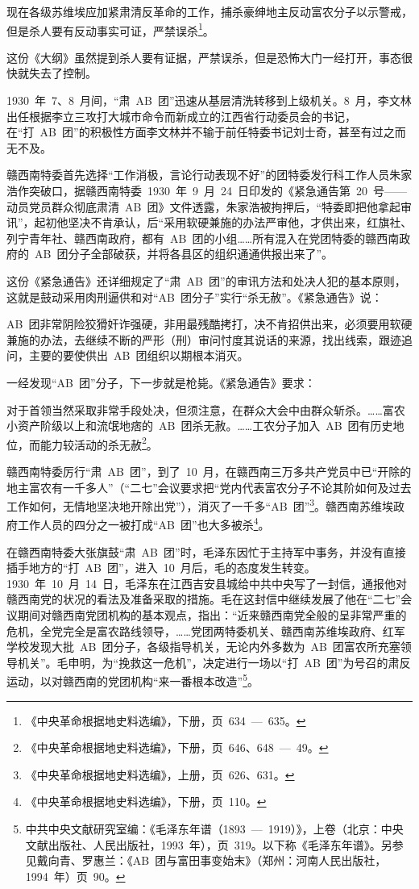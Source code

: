 \begin{quoting}
现在各级苏维埃应加紧肃清反革命的工作，捕杀豪绅地主反动富农分子以示警戒，但是杀人要有反动事实可证，严禁误杀\footnote{《中央革命根据地史料选编》，下册，页~634~—~635。}。
\end{quoting}

这份《大纲》虽然提到杀人要有证据，严禁误杀，但是恐怖大门一经打开，事态很快就失去了控制。

1930~年~7、8~月间，“肃~AB~团”迅速从基层清洗转移到上级机关。8~月，李文林出任根据李立三攻打大城市命令而新成立的江西省行动委员会的书记，在“打~AB~团”的积极性方面李文林并不输于前任特委书记刘士奇，甚至有过之而无不及。

赣西南特委首先选择“工作消极，言论行动表现不好”的团特委发行科工作人员朱家浩作突破口，据赣西南特委~1930~年~9~月~24~日印发的《紧急通告第~20~号——动员党员群众彻底肃清~AB~团》文件透露，朱家浩被拘押后，“特委即把他拿起审讯”，起初他坚决不肯承认，后“采用软硬兼施的办法严审他，才供出来，红旗社、列宁青年社、赣西南政府，都有~AB~团的小组……所有混入在党团特委的赣西南政府的~AB~团分子全部破获，并将各县区的组织通通供报出来了”。

这份《紧急通告》还详细规定了“肃~AB~团”的审讯方法和处决人犯的基本原则，这就是鼓动采用肉刑逼供和对“AB~团分子”实行“杀无赦”。《紧急通告》说：

\begin{quoting}
AB~团非常阴险狡猾奸诈强硬，非用最残酷拷打，决不肯招供出来，必须要用软硬兼施的办法，去继续不断的严形（刑）审问忖度其说话的来源，找出线索，跟迹追问，主要的要使供出~AB~团组织以期根本消灭。
\end{quoting}
一经发现“AB~团”分子，下一步就是枪毙。《紧急通告》要求：

\begin{quoting}
对于首领当然采取非常手段处决，但须注意，在群众大会中由群众斩杀。……富农小资产阶级以上和流氓地痞的~AB~团杀无赦。……工农分子加入~AB~团有历史地位，而能力较活动的杀无赦\footnote{《中央革命根据地史料选编》，下册，页~646、648~—~49。}。
\end{quoting}

赣西南特委厉行“肃~AB~团”，到了~10~月，在赣西南三万多共产党员中已“开除的地主富农有一千多人”（“二七”会议要求把“党内代表富农分子不论其阶如何及过去工作如何，无情地坚决地开除出党”），消灭了一千多“AB~团”\footnote{《中央革命根据地史料选编》，上册，页~626、631。}。赣西南苏维埃政府工作人员的四分之一被打成“AB~团”也大多被杀\footnote{《中央革命根据地史料选编》，下册，页~110。}。

在赣西南特委大张旗鼓“肃~AB~团”时，毛泽东因忙于主持军中事务，并没有直接插手地方的“打~AB~团”，进入~10~月后，毛的态度发生转变。1930~年~10~月~14~日，毛泽东在江西吉安县城给中共中央写了一封信，通报他对赣西南党的状况的看法及准备采取的措施。毛在这封信中继续发展了他在“二七”会议期间对赣西南党团机构的基本观点，指出：“近来赣西南党全般的呈非常严重的危机，全党完全是富农路线领导，……党团两特委机关、赣西南苏维埃政府、红军学校发现大批~AB~团分子，各级指导机关，无论内外多数为~AB~团富农所充塞领导机关”。毛申明，为“挽救这一危机”，决定进行一场以“打~AB~团”为号召的肃反运动，以对赣西南的党团机构“来一番根本改造”\footnote{中共中央文献研究室编：《毛泽东年谱（1893~—~1919）》，上卷（北京：中央文献出版社、人民出版社，1993~年），页~319。以下称《毛泽东年谱》。另参见戴向青、罗惠兰：《AB~团与富田事变始末》（郑州：河南人民出版社，1994~年）页~90。}。

